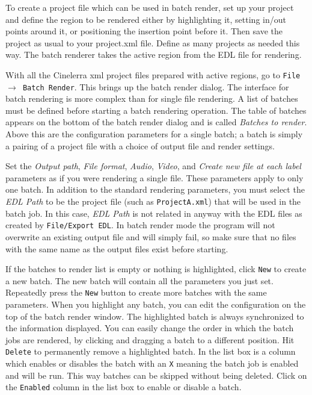 To create a project file which can be used in batch render, set up your project and define the region to be rendered either by highlighting it, setting in/out points around it, or positioning the insertion point before it. Then save the project as usual to your project.xml file. Define as many projects as needed this way.  The batch renderer takes the active region from the EDL file for rendering.

With all the Cinelerra xml project files prepared with active regions, go to \texttt{File $\rightarrow$ Batch Render}. This brings up the batch render dialog. The interface for batch rendering is more complex than for single file rendering.  A list of batches must be defined before starting a batch rendering operation.  The table of batches appears on the bottom of the batch render dialog and is called \textit{Batches to render}.  Above this are the configuration parameters for a single batch; a batch is simply a pairing of a project file with a choice of output file and render settings.

Set the \textit{Output path}, \textit{File format}, \textit{Audio}, \textit{Video}, and \textit{Create new file at each label} parameters as if you were rendering a single file.  These parameters apply to only one batch.  In addition to the standard rendering parameters, you must select the \textit{EDL Path} to be the project file (such as \texttt{ProjectA.xml}) that will be used in the batch job.  In this case, \textit{EDL Path} is not related in anyway with the EDL files as created by \texttt{File/Export EDL}.  In batch render mode the program will not overwrite an existing output file and will simply fail, so make sure that no files with the same name as the output files exist before starting.

If the batches to render list is empty or nothing is highlighted, click \texttt{New} to create a new batch. The new batch will contain all the parameters you just set.  Repeatedly press the \texttt{New} button to create more batches with the same parameters.  When you highlight any batch, you can edit the configuration on the top of the batch render window. The highlighted batch is always synchronized to the information displayed.  You can easily change the order in which the batch jobs are rendered, by clicking and dragging a batch to a different position.  Hit \texttt{Delete} to permanently remove a highlighted batch. In the list box is a column which enables or disables the batch with an \texttt{X} meaning the batch job is enabled and will be run.  This way batches can be skipped without being deleted.  Click on the \texttt{Enabled} column in the list box to enable or disable a batch.

